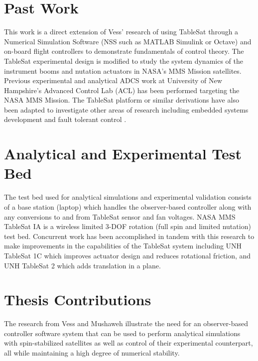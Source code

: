 \section{Past Work}
\label{sec:PastWork}

This work is a direct extension of Vess' research \cite{vessthesis} of using TableSat through a Numerical Simulation Software (NSS such as MATLAB Simulink or Octave) and on-board flight controllers to demonstrate fundamentals of control theory.  The TableSat experimental design is modified to study the system dynamics of the instrument booms and nutation actuators in NASA's MMS Mission satellites.  Previous experimental \cite{tsat1b} \cite{tsat1c} \cite{tsat2} and analytical \cite{mushawehthesis} ADCS work at University of New Hampshire's Advanced Control Lab (ACL) has been performed targeting the NASA MMS Mission.  The TableSat platform or similar derivations have also been adapted to investigate other areas of research including embedded systems development \cite{tablesat_xuml} and fault tolerant control \cite{tablesat_object_bench} \cite{nanjing_university}.


\section{Analytical and Experimental Test Bed}
\label{sec:AnalyticalandExperimentalTestbed}

The test bed used for analytical simulations and experimental validation consists of a base station (laptop) which handles the observer-based controller along with any conversions to and from TableSat sensor and fan voltages.  NASA MMS TableSat IA is a wireless limited 3-DOF rotation (full spin and limited nutation) test bed.  Concurrent work has been accomplished in tandem with this research to make improvements in the capabilities of the TableSat system including UNH TableSat 1C \cite{tsat1c} which improves actuator design and reduces rotational friction, and UNH TableSat 2 \cite{tsat2} which adds translation in a plane.

\section{Thesis Contributions}
\label{sec:ThesisContributions}

The research from Vess and Mushaweh illustrate the need for an observer-based controller software system that can be used to perform analytical simulations with spin-stabilized satellites as well as control of their experimental counterpart, all while maintaining a high degree of numerical stability.

